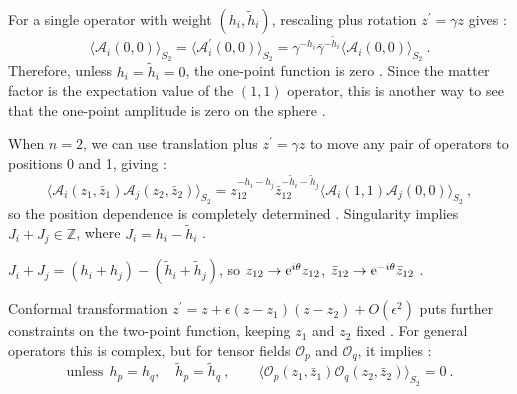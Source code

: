 For a single operator with weight $(h_{i}, \tilde{h}_{i})$, rescaling plus rotation $z^{\prime}=\gamma z$ gives :
\begin{equation}
	\bigl\langle\mathscr{A}_{i}(0,0)\bigr\rangle_{S_{2}} = \bigl\langle\mathscr{A}_{i}^{\prime}(0,0)\bigr\rangle_{S_{2}}
	=\gamma^{-h_{i}} \bar{\gamma}^{-\tilde{h}_{i}}\bigl\langle\mathscr{A}_{i}(0,0)\bigr\rangle_{S_{2}} \:. \label{6.7.3}
\end{equation}
Therefore, unless $h_{i}=\tilde{h}_{i}=0$, the one-point function is zero . Since the matter factor is the expectation value of the $(1,1)$ operator, this is another way to see that the one-point amplitude is zero on the sphere .

When $n=2$, we can use translation plus $z^{\prime}=\gamma z$ to move any pair of operators to positions 0 and 1, giving :
\begin{equation}
	\bigl\langle\mathscr{A}_{i}(z_{1}, \bar{z}_{1}) \mathscr{A}_{j}(z_{2}, \bar{z}_{2})\bigr\rangle_{S_{2}}
	=z_{12}^{-h_{i}-h_{j}} \bar{z}_{12}^{-\tilde{h}_{i}-\tilde{h}_{j}}
	\bigl\langle\mathscr{A}_{i}(1,1) \mathscr{A}_{j}(0,0)\bigr\rangle_{S_{2}} \:, \label{6.7.4}
\end{equation}
so the position dependence is completely determined . Singularity implies $J_{i}+J_{j} \in \mathds{Z}$, where $J_{i}=h_{i}-\tilde{h}_{i}$ .
\begin{tcolorbox}
	\begin{remark}
		$J_{i}+J_{j}=(h_{i}+h_{j})-(\tilde{h}_{i}+\tilde{h}_{j})$, so $z_{12} \rightarrow \mathrm{e}^{i \theta} z_{12}$, $\bar{z}_{12}\rightarrow \mathrm{e}^{-i \theta} \bar{z}_{12}$ .
	\end{remark}
\end{tcolorbox}
\noindent Conformal transformation $z^{\prime}=z+\epsilon(z-z_{1})(z-z_{2})+O(\epsilon^{2})$ puts further constraints on the two-point function, keeping $z_1$ and $z_2$ fixed . For general operators this is complex, but for tensor fields $\mathcal{O}_{p}$ and $\mathcal{O}_{q}$, it implies :
\begin{equation}
	\text{unless}\:\: h_{p}=h_{q}, \quad \tilde{h}_{p}=\tilde{h}_{q}\:, \qquad 
	\bigl\langle\mathcal{O}_{p}(z_{1}, \bar{z}_{1}) \mathcal{O}_{q}(z_{2}, \bar{z}_{2})\bigr\rangle_{S_{2}}=0 \:. \label{6.7.5}
\end{equation}

